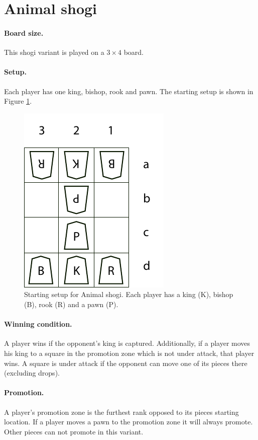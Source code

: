 \documentclass[a4paper, 11pt]{article}
\begin{document}
{\section{Animal shogi}
\label{dobutsu}

\paragraph{Board size.} This shogi variant is played on a $3 \times 4$ board.

\paragraph{Setup.} Each player has one king, bishop, rook and pawn. The starting setup is shown in Figure \ref{dobutsusetup}.
\begin{figure}[h]
\center
\includegraphics{dobutsushogi.pdf}
\caption{Starting setup for Animal shogi. Each player has a king (K), bishop (B), rook (R) and a pawn (P).}
\label{dobutsusetup}
\end{figure}

\paragraph{Winning condition.} A player wins if the opponent's king is captured. Additionally, if a player moves his king to a square in the promotion zone
which is not under attack, that player wins. A square is under attack if the opponent can move one of its pieces there (excluding drops).

\paragraph{Promotion.}  A player's promotion zone is the furthest rank opposed to its pieces starting location. If a player moves a pawn to the promotion zone it will
always promote. Other pieces can not promote in this variant.

}
\end{document}
